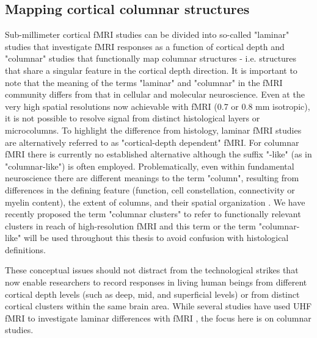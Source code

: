 \subsection{Mapping cortical columnar structures}
Sub-millimeter cortical fMRI studies can be divided into so-called "laminar" studies that investigate fMRI responses as a function of cortical depth and "columnar" studies that functionally map columnar structures - i.e. structures that share a singular feature in the cortical depth direction. It is important to note that the meaning of the terms "laminar" and "columnar" in the fMRI community differs from that in cellular and molecular neuroscience. Even at the very high spatial resolutions now achievable with fMRI (0.7 or 0.8 mm isotropic), it is not possible to resolve signal from distinct histological layers or microcolumns. To highlight the difference from histology, laminar fMRI studies are alternatively referred to as "cortical-depth dependent" fMRI. For columnar fMRI there is currently no established alternative although the suffix "-like" (as in "columnar-like") is often employed. Problematically, even within fundamental neuroscience there are different meanings to the term "column", resulting from differences in the defining feature (function, cell constellation, connectivity or myelin content), the extent of columns, and their spatial organization \parencite{Rakic2008}. We have recently proposed the term "columnar clusters" to refer to functionally relevant clusters in reach of high-resolution fMRI \parencite{Schneider2019} and this term or the term "columnar-like" will be used throughout this thesis to avoid confusion with histological definitions.

These conceptual issues should not distract from the technological strikes that now enable researchers to record responses in living human beings from different cortical depth levels (such as deep, mid, and superficial levels) or from distinct cortical clusters within the same brain area. While several studies have used UHF fMRI to investigate laminar differences with fMRI \parencite{Ress2007, Polimeni2010, Koopmans2010, Koopmans2011, Olman2012, DeMartino2013, Huber2015, Muckli2015, Kok2016, Huber2017, Marquardt2018, Kashyap2018}, the focus here is on columnar studies.


